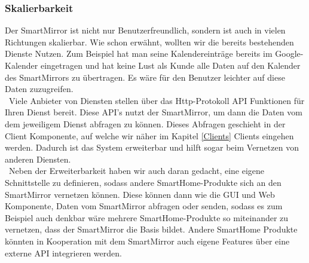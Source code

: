 \subsubsection{Skalierbarkeit}\label{Skalierbarkeit}
Der SmartMirror ist nicht nur Benutzerfreundlich, sondern ist auch in vielen Richtungen skalierbar.
Wie schon erwähnt, wollten wir die bereits bestehenden Dienste Nutzen. Zum Beispiel hat man seine Kalendereinträge bereits im Google-Kalender eingetragen und hat keine Lust als Kunde alle Daten auf den Kalender des SmartMirrors zu übertragen. Es wäre für den Benutzer leichter auf diese Daten zuzugreifen. \\\
Viele Anbieter von Diensten stellen über das Http-Protokoll API Funktionen für Ihren Dienst bereit. Diese API's nutzt der SmartMirror, um dann die Daten vom dem jeweiligem Dienst abfragen zu können. Dieses Abfragen geschieht in der Client Komponente, auf welche wir näher im Kapitel \ref{Clients} Clients eingehen werden. Dadurch ist das System erweiterbar und hilft sogar beim Vernetzen von anderen Diensten.\\\
Neben der Erweiterbarkeit haben wir auch daran gedacht, eine eigene Schnittstelle zu definieren, sodass andere SmartHome-Produkte sich an den SmartMirror vernetzen können. Diese können dann wie die GUI und Web Komponente, Daten vom SmartMirror abfragen oder senden, sodass es zum Beispiel auch denkbar wäre mehrere SmartHome-Produkte so miteinander zu vernetzen, dass der SmartMirror die Basis bildet. Andere SmartHome Produkte könnten in Kooperation mit dem SmartMirror auch eigene Features über eine externe API integrieren werden.\\\



